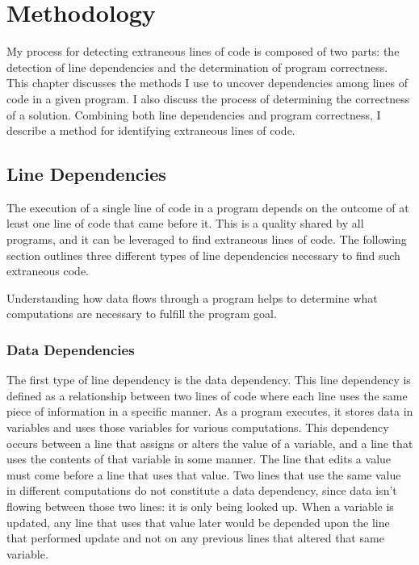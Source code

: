 \renewcommand{\thechapter}{4}
\chapter{Methodology}
My process for detecting extraneous lines of code is composed of two parts: the detection of line dependencies and the determination of program correctness. This chapter discusses the methods I use to uncover dependencies among lines of code in a given program. I also discuss the process of determining the correctness of a solution. Combining both line dependencies and program correctness, I describe a method for identifying extraneous lines of code.

\section{Line Dependencies}
The execution of a single line of code in a program depends on the outcome of at least one line of code that came before it. This is a quality shared by all programs, and it can be leveraged to find extraneous lines of code. The following section outlines three different types of line dependencies necessary to find such extraneous code.

Understanding how data flows through a program helps to determine what computations are necessary to fulfill the program goal.

\subsection{Data Dependencies}
The first type of line dependency is the data dependency. This line dependency is defined as a relationship between two lines of code where each line uses the same piece of information in a specific manner. As a program executes, it stores data in variables and uses those variables for various computations. This dependency occurs between a line that assigns or alters the value of a variable, and a line that uses the contents of that variable in some manner. The line that edits a value must come before a line that uses that value. Two lines that use the same value in different computations do not constitute a data dependency, since data isn't flowing between those two lines: it is only being looked up. When a variable is updated, any line that uses that value later would be depended upon the line that performed update and not on any previous lines that altered that same variable. 

